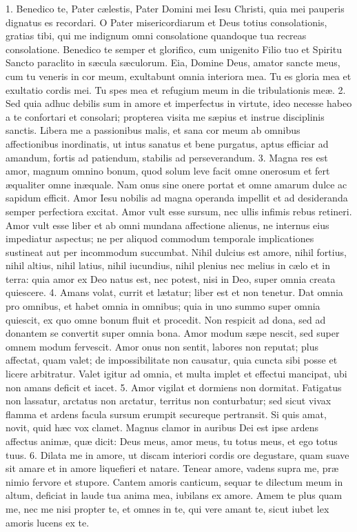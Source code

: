 \documentclass[twoside]{article}
\begin{document}
1. Benedico te, Pater cælestis, Pater Domini mei Iesu Christi, quia mei pauperis dignatus es recordari. O Pater misericordiarum et Deus totius consolationis, gratias tibi, qui me indignum omni consolatione quandoque tua recreas consolatione. Benedico te semper et glorifico, cum unigenito Filio tuo et Spiritu Sancto paraclito in sæcula sæculorum. Eia, Domine Deus, amator sancte meus, cum tu veneris in cor meum, exultabunt omnia interiora mea. Tu es gloria mea et exultatio cordis mei. Tu spes mea et refugium meum in die tribulationis meæ.
2. Sed quia adhuc debilis sum in amore et imperfectus in virtute, ideo necesse habeo a te confortari et consolari; propterea visita me sæpius et instrue disciplinis sanctis. Libera me a passionibus malis, et sana cor meum ab omnibus affectionibus inordinatis, ut intus sanatus et bene purgatus, aptus efficiar ad amandum, fortis ad patiendum, stabilis ad perseverandum.
3. Magna res est amor, magnum omnino bonum, quod solum leve facit omne onerosum et fert æqualiter omne inæquale. Nam onus sine onere portat et omne amarum dulce ac sapidum efficit. Amor Iesu nobilis ad magna operanda impellit et ad desideranda semper perfectiora excitat. Amor vult esse sursum, nec ullis infimis rebus retineri. Amor vult esse liber et ab omni mundana affectione alienus, ne internus eius impediatur aspectus; ne per aliquod commodum temporale implicationes sustineat aut per incommodum succumbat. Nihil dulcius est amore, nihil fortius, nihil altius, nihil latius, nihil iucundius, nihil plenius nec melius in cælo et in terra: quia amor ex Deo natus est, nec potest, nisi in Deo, super omnia creata quiescere.
4. Amans volat, currit et lætatur; liber est et non tenetur. Dat omnia pro
omnibus, et habet omnia in omnibus; quia in uno summo super omnia quiescit, ex quo omne bonum fluit et procedit. Non respicit ad dona, sed ad donantem se convertit super omnia bona. Amor modum sæpe nescit, sed super omnem modum fervescit. Amor onus non sentit, labores non reputat; plus affectat, quam valet; de impossibilitate non causatur, quia cuncta sibi posse et licere arbitratur. Valet igitur ad omnia, et multa implet et effectui mancipat, ubi non amans deficit et iacet.
5. Amor vigilat et dormiens non dormitat. Fatigatus non lassatur, arctatus non arctatur, territus non conturbatur; sed sicut vivax flamma et ardens facula sursum erumpit secureque pertransit. Si quis amat, novit, quid hæc vox clamet. Magnus clamor in auribus Dei est ipse ardens affectus animæ, quæ dicit: Deus meus, amor meus, tu totus meus, et ego totus tuus.
6. Dilata me in amore, ut discam interiori cordis ore degustare, quam suave sit amare et in amore liquefieri et natare. Tenear amore, vadens supra me, præ nimio fervore et stupore. Cantem amoris canticum, sequar te dilectum meum in altum, deficiat in laude tua anima mea, iubilans ex amore. Amem te plus quam me, nec me nisi propter te, et omnes in te, qui vere amant te, sicut iubet lex amoris lucens ex te.
\end{document}
